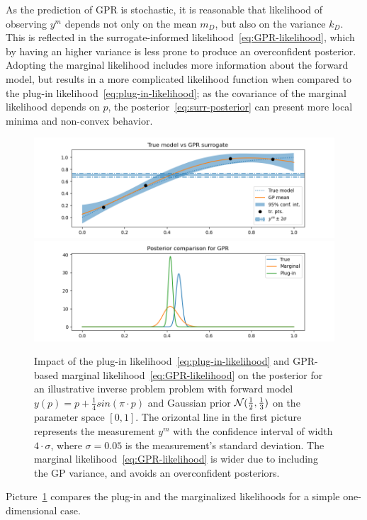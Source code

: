 As the prediction of GPR is stochastic, it is reasonable that likelihood of observing $y^m$ depends not only on the mean $m_D$, but also on the variance $k_D$. 
This is reflected in the surrogate-informed likelihood~\eqref{eq:GPR-likelihood}, which by having an higher variance is less prone to produce an overconfident posterior.
Adopting the marginal likelihood includes more information about the forward model, but results in a more complicated likelihood function when compared to the plug-in likelihood~\eqref{eq:plug-in-likelihood}; as the covariance of the marginal likelihood depends on $p$, the posterior~\ref{eq:surr-posterior} can present more local minima and non-convex behavior.
\begin{figure}[H] 

    \begin{centering}
    \includegraphics[width = 360pt]{results/pictures/d1/GP_model_comparison.png}
    \includegraphics[width = 360pt]{results/pictures/d1/GP_posterior_comparison.png}
    \end{centering}
    
    \caption{Impact of the plug-in likelihood~\eqref{eq:plug-in-likelihood} and GPR-based marginal likelihood~\eqref{eq:GPR-likelihood} on the posterior for an illustrative inverse problem problem with forward model $y(p) = p +\frac{1}{4} sin(\pi \cdot p)$ and Gaussian prior $\mathcal N(\frac{1}{2}, \frac{1}{3})$ on the parameter space $[0,1]$. The orizontal line in the first picture represents the measurement $y^m$ with the confidence interval of width $4 \cdot \sigma$, where $\sigma = 0.05$ is the measurement's standard deviation. The marginal likelihood~\eqref{eq:GPR-likelihood} is wider due to including the GP variance, and avoids an overconfident posteriors.} 
    \label{fig:GP-likelihoods}
\end{figure}  
Picture~\ref{fig:GP-likelihoods} compares the plug-in and the marginalized likelihoods for a simple one-dimensional case.


